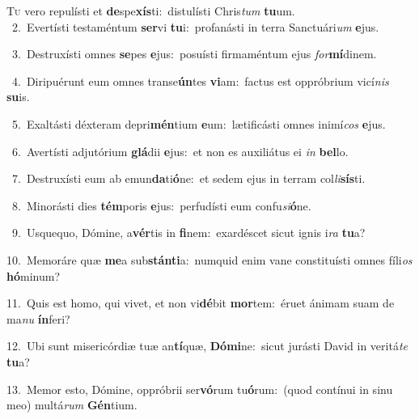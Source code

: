 \lettrine{\initial\textcolor{\initialcolor}{T}}{u} vero repulísti et \textbf{de}\-spe\-\textbf{xís}\-ti:~\star distulísti Chris\textit{tum} \textbf{tu}\-um.\\
{\numbfont\textcolor{\numbcolor}{~2.}}~Evertísti testaméntum \textbf{ser}\-vi \textbf{tu}\-i:~\star profanásti in terra Sanctuári\textit{um} \textbf{e}\-jus.\par
{\numbfont\textcolor{\numbcolor}{~3.}}~Destruxísti omnes \textbf{se}\-pes \textbf{e}\-jus:~\star posuísti firmaméntum ejus \textit{for}\-\textbf{mí}dinem.\par
{\numbfont\textcolor{\numbcolor}{~4.}}~Diripuérunt eum omnes transe\-\textbf{ún}\-tes \textbf{vi}\-am:~\star factus est oppróbrium vicí\textit{nis} \textbf{su}\-is.\par
{\numbfont\textcolor{\numbcolor}{~5.}}~Exaltásti déxteram depri\-\textbf{mén}\-tium \textbf{e}\-um:~\star lætificásti omnes inimí\textit{cos} \textbf{e}\-jus.\par
{\numbfont\textcolor{\numbcolor}{~6.}}~Avertísti adjutórium \textbf{glá}\-dii \textbf{e}\-jus:~\star et non es auxiliátus ei \textit{in} \textbf{bel}\-lo.\par
{\numbfont\textcolor{\numbcolor}{~7.}}~Destruxísti eum ab emun\-\textbf{da}\-ti\-\textbf{ó}\-ne:~\star et sedem ejus in terram col\-\textit{li}\-\textbf{sís}ti.\par
{\numbfont\textcolor{\numbcolor}{~8.}}~Minorásti dies \textbf{tém}\-poris \textbf{e}\-jus:~\star perfudísti eum confu\-\textit{si}\-\textbf{ó}ne.\par
{\numbfont\textcolor{\numbcolor}{~9.}}~Usquequo, Dómine, a\-\textbf{vér}\-tis in \textbf{fi}\-nem:~\star exardéscet sicut ignis i\textit{ra} \textbf{tu}\-a?\par
{\numbfont\textcolor{\numbcolor}{10.}}~Memoráre quæ \textbf{me}\-a sub\-\textbf{stán}\-\textbf{ti}a:~\star numquid enim vane constituísti omnes fíli\textit{os} \textbf{hó}\-minum?\par
{\numbfont\textcolor{\numbcolor}{11.}}~Quis est homo, qui vivet, et non vi\-\textbf{dé}\-bit \textbf{mor}\-tem:~\star éruet ánimam suam de ma\textit{nu} \textbf{ín}\-feri?\par
{\numbfont\textcolor{\numbcolor}{12.}}~Ubi sunt misericórdiæ tuæ an\-\textbf{tí}\-quæ, \textbf{Dó}\-\textbf{mi}ne:~\star sicut jurásti David in veritá\textit{te} \textbf{tu}\-a?\par
{\numbfont\textcolor{\numbcolor}{13.}}~Memor esto, Dómine, oppróbrii ser\-\textbf{vó}\-rum tu\-\textbf{ó}\-rum:~\star (quod contínui in sinu meo) multá\textit{rum} \textbf{Gén}\-tium.\par
